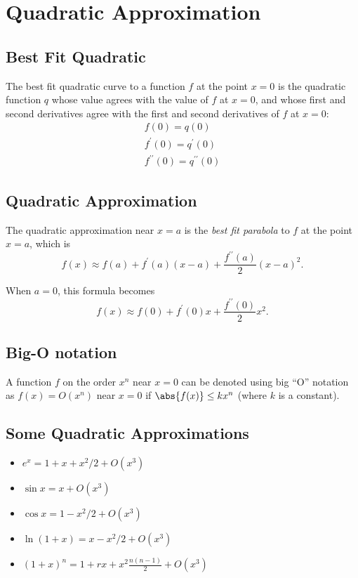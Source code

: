 \section{Quadratic Approximation}
\subsection{Best Fit Quadratic}
The best fit quadratic curve to a function $f$ at the point $x=0$ is the quadratic function $q$ whose value agrees with the value of $f$ at $x=0$, and whose first and second derivatives agree with the first and second derivatives of $f$ at $x=0$:
\begin{gather*}
  f(0)=q(0)\\
  f^\prime (0)=q^\prime (0)\\
  f^{\prime\prime}(0)=q^{\prime\prime}(0)
\end{gather*}

\subsection{Quadratic Approximation}
The quadratic approximation near $x=a$ is the \textit{best fit parabola} to $f$ at the point $x=a$, which is 
\[f(x)\approx f(a)+f^\prime (a)(x-a)+\frac{f^{\prime\prime}(a)}{2}(x-a)^2.\]

When $a=0$, this formula becomes
\[f(x)\approx f(0)+f^\prime (0)x+\frac{f^{\prime\prime}(0)}2 x^2.\]

\subsection{Big-O notation}
A function $f$ on the order $x^n$ near $x=0$ can be denoted using big ``O'' notation as $f(x)=O(x^n)$ near $x=0$ if $\abs{f(x)}\leq kx^n$ (where $k$ is a constant).

\subsection{Some Quadratic Approximations}
\begin{itemize}
\item$e^x=1+x+x^2/2+O(x^3)$
\item$\sin x=x+O(x^3)$
\item$\cos x=1-x^2/2+O(x^3)$
\item$\ln(1+x)=x-x^2/2+O(x^3)$
\item$(1+x)^n=1+rx+x^2\frac{n(n-1)}2+O(x^3)$
\end{itemize}

